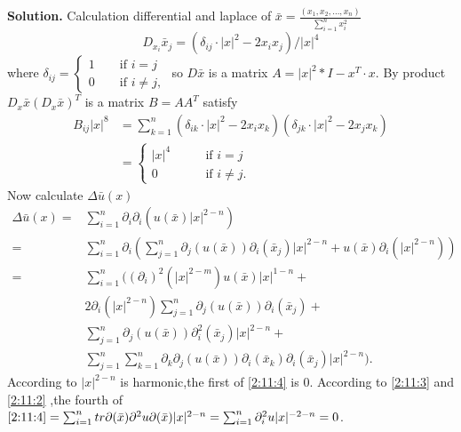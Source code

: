 \message{ !name(21935004-\unexpanded{谭焱}-homework2.tex)}\documentclass[a4paper]{book}
\newenvironment{solution}%
{\noindent\textbf{Solution.}}%
{\qedhere}
\numberwithin{equation}{chapter}
\theoremstyle{definition}
\begin{document}
\begin{multicols}{2}
\begin{solution}
	Calculation differential and laplace of $\bar{x} = \frac{(x_1, x_2,...,x_n)}{\sum_{i = 1}^{n} x_i^2} $ 
	\begin{equation}\label{2:11:2}
		D_{x_i} \bar{x}_j = (\delta_{ij} \cdot |x|^2 - 2x_ix_j)/ |x|^4 
	\end{equation}
	where $\delta_{ij} = 
	\begin{cases}
	1 \qquad \text{if } i = j \\
	0 \qquad \text{if } i \neq j,
	\end{cases}$
	so $D\bar{x}$ is a matrix $A = |x|^2 * I - x^T \cdot x$.
	By product $D_x \bar{x}(D_x \bar{x})^T$ is a matrix $B = AA^T$ satisfy
	\begin{equation}\label{2:11:3}
	\begin{aligned} 
		B_{ij}|x|^8 &= \sum_{k = 1}^{n}(\delta_{ik} \cdot |x|^2 - 2x_{i} x_k)(\delta_{jk} \cdot |x|^2 - 2x_{j} x_k)\\
		&=
		\begin{cases}
		|x|^4 \qquad &\text{if } i = j \\ 
		0 \qquad &\text{if } i \neq j.
		\end{cases}
	\end{aligned} 
	\end{equation}
	Now calculate $\Delta \bar{u}(x)$
	\begin{equation}\label{2:11:4}
		\begin{aligned}
		\Delta \bar{u}(x) =& \sum_{i = 1}^{n} \partial_i \partial_i(u(\bar{x})|x|^{2-n}) \\
		=&  \sum_{i = 1}^{n} \partial_i (\sum_{j = 1}^{n}\partial_j (u(\bar{x}))\partial_i(\bar{x}_j)|x|^{2-n} + u(\bar{x})\partial_i(|x|^{2-n}))  \\
		=& \sum_{i = 1}^{n}((\partial_i)^2(|x|^{2-m})u(\bar{x})|x|^{1-n} + \\ &2\partial_i(|x|^{2-n})\sum_{j = 1}^{n}\partial_j (u(\bar{x}))\partial_i(\bar{x}_j) + \\
		&\sum_{j = 1}^{n}\partial_j (u(\bar{x})) \partial_i^2(\bar{x}_j)|x|^{2-n}　+\\
		&\sum_{j = 1}^{n}\sum_{k = 1}^{n}\partial_k\partial_j(u(\bar{x})) \partial_i(\bar{x}_k)\partial_i(\bar{x}_j)|x|^{2-n}　  ). 
		\end{aligned}
	\end{equation}
	According to $|x|^{2-n}$ is harmonic,the first of \ref{2:11:4} is 0.
	According to \ref{2:11:3} and \ref{2:11:2} ,the fourth of $\ref{2:11:4} = \sum_{i = 1}^{n} tr{\partial(\bar{x}) \partial^2u \partial(\bar{x})}|x|^{2-n} = \sum_{i = 1}^{n} \partial_i^2 u |x|^{-2-n} = 0$. 

\end{solution}
\end{multicols}
\end{document}
